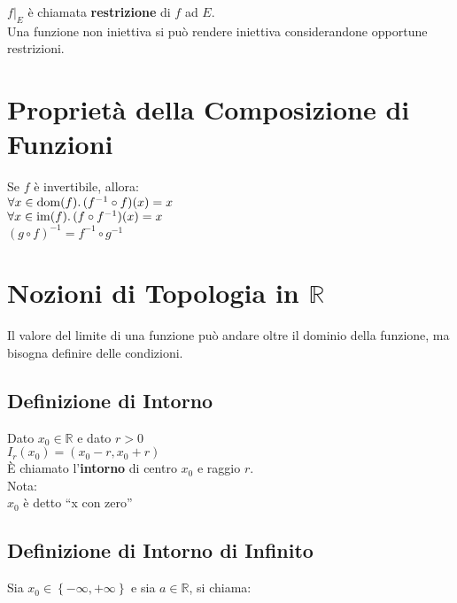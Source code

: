 \documentclass[a4paper, twoside, italian, 11pt]{book}
\newcommand{\braces}[1] {\left \{ #1 \right \}}
\DeclareMathOperator{\dom}{dom}
\DeclareMathOperator{\im}{im}
\newcommand{\R}{\mathbb{R}}
\begin{document}
\noindent
$f|_E$ è chiamata \textbf{restrizione} di $f$ ad $E$. \\

\noindent
Una funzione non iniettiva si può rendere iniettiva considerandone opportune restrizioni. %



\section{Proprietà della Composizione di Funzioni}

\noindent
Se $f$ è invertibile, allora: \\

$\forall x \in \dom(f)\ldotp (f^{-1} \circ f)(x) = x$ \\
\indent
$\forall x \in \im(f)\ldotp (f \circ f^{-1})(x) = x$ \\
\indent
$(g \circ f)^{-1} = f^{-1} \circ g^{-1}$



\section{Nozioni di Topologia in $\R$}

\noindent
Il valore del limite di una funzione può andare oltre il dominio della funzione, ma bisogna definire delle condizioni.


\subsection{Definizione di Intorno}

\noindent
Dato $x_0 \in \R$ e dato $r > 0$ \\

$I_r(x_0) = (x_0 - r, x_0 + r)$ \\

\noindent
È chiamato l'\textbf{intorno} di centro $x_0$ e raggio $r$. \\

\noindent
Nota: \\
$x_0$ è detto ``x con zero''

\subsection{Definizione di Intorno di Infinito}

\noindent
Sia $x_0 \in \braces{-\infty, +\infty}$ e sia $a \in \R$, si chiama: \\
\end{document}
